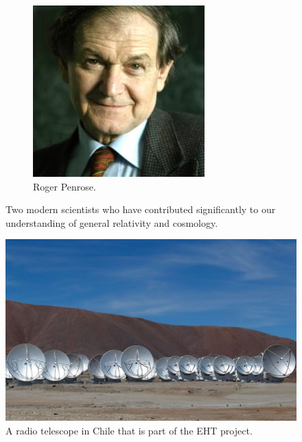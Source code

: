 \documentclass[a4paper]{amsbook}
\theoremstyle{definition}
\numberwithin{exercise}{chapter}
\numberwithin{exercise}{chapter}
\newcommand\capcite[1]{}
\begin{document}
\begin{figure}
\begin{subfigure}{0.4\textwidth}
    \includegraphics[width = \textwidth]{penrose}
    \caption{Roger Penrose. \capcite{https://www.maths.ox.ac.uk/system/files/styles/profile/private/user-photos/rouse.jpg?itok=nALkNWoU} \label{fig:penrose}}
  \end{subfigure}%
  \caption{Two modern scientists who have contributed significantly to our understanding of general relativity and cosmology. \label{fig:hp}}
\end{figure}

\begin{figure}
  \centering
  \includegraphics[width=\textwidth]{eht}
  \caption{A radio telescope in Chile that is part of the EHT project. \capcite{http://i.telegraph.co.uk/multimedia/archive/02508/alma-wide_2508105k.jpg} \label{fig:eht}}
\end{figure}
\end{document}
